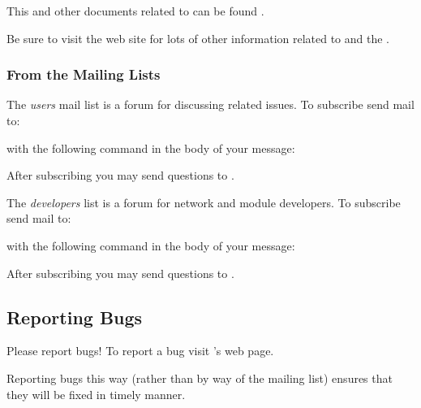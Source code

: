 This and other documents related to \sr{} can be found 
.

Be sure to visit the \sci{} web site for lots of other
information related to \sr{} and the \scii{}.

\subsubsection{From the Mailing Lists}

The \sr{} \emph{users} mail list is a forum for discussing \sr{}
related issues.  To subscribe send mail to:


with the following command in the body of your message:


After subscribing you may send questions to
.

The \sr{} \emph{developers} list is a forum for network and module
developers.  To subscribe send mail to:


with the following command in the body of your message:


After subscribing you may send questions to
.

\subsection{Reporting Bugs}
\label{sec:bugs}

Please report bugs!  To report a bug visit \sr{}'s
 web page.

Reporting bugs this way (rather than by way of the mailing list) ensures
that they will be fixed in timely manner.

